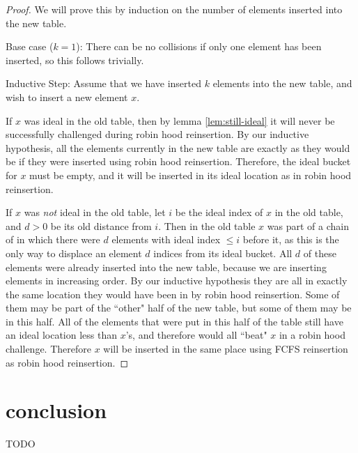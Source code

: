 \documentclass{cccg13}
\begin{document}
\begin{proof}
  We will prove this by induction on the number of elements inserted into the new table.

  Base case ($k = 1$): There can be no collisions if only one element has been inserted, so this follows trivially.

  Inductive Step: Assume that we have inserted $k$ elements into the new table, and wish to insert a new element $x$.

  If $x$ was ideal in the old table, then by lemma \ref{lem:still-ideal} it will never be successfully challenged during robin hood reinsertion. By our inductive hypothesis, all the elements currently in the new table are exactly as they would be if they were inserted using robin hood reinsertion. Therefore, the ideal bucket for $x$ must be empty, and it will be inserted in its ideal location as in robin hood reinsertion.

  If $x$ was \emph{not} ideal in the old table, let $i$ be the ideal index of $x$ in the old table, and $d > 0$ be its old distance from $i$. Then in the old table $x$ was part of a chain of in which there were $d$ elements with ideal index $\leq i$ before it, as this is the only way to displace an element $d$ indices from its ideal bucket. All $d$ of these elements were already inserted into the new table, because we are inserting elements in increasing order. By our inductive hypothesis they are all in exactly the same location they would have been in by robin hood reinsertion. Some of them may be part of the ``other" half of the new table, but some of them may be in this half. All of the elements that were put in this half of the table still have an ideal location less than $x$'s, and therefore would all ``beat" $x$ in a robin hood challenge. Therefore $x$ will be inserted in the same place using FCFS reinsertion as robin hood reinsertion.
\end{proof}

\section{conclusion}

TODO

\small


\end{document}
